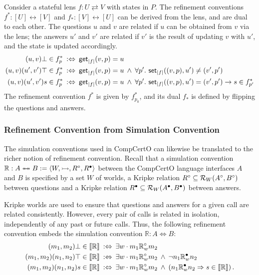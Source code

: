 Consider a stateful lens
$f: U \rightleftarrows V$
with states in $P$.
The refinement conventions
$f^* : [U] \leftrightarrow [V]$
and
$f_* : [V] \leftrightarrow [U]$
can be derived from the lens,
and are dual to each other.
The questions $u$ and $v$
are related if $u$ can be obtained from $v$
via the lens;
the answers $u'$ and $v'$ are related
if $v'$ is the result of updating $v$ with $u'$,
and the state is updated accordingly.
\begin{align*}
  (u, v)\bot \in f^*_p
  & \::\Leftrightarrow\:
   \mathsf{get} _{|f|} (v, p) = u \\
  (u, v)(u', v')\top \in f^*_p
  & \::\Leftrightarrow\:
   \mathsf{get} _{|f|} (v, p) = u \:\wedge\:
  \forall p'.\  \mathsf{set} _{|f|} ((v, p), u') \neq (v', p')\\
  (u, v)(u', v') s \in f^*_p
  & \::\Leftrightarrow\:
   \mathsf{get} _{|f|} (v, p) = u \:\wedge\:
  \forall p'.\  \mathsf{set} _{|f|} ((v, p), u') = (v', p') \rightarrow
  s \in f^*_{p'}
\end{align*}
The refinement convention $f^*$
is given by $f^*_{p_0}$,
and its dual $f_*$ is defined
by flipping the questions and answers.

\subsubsection{Refinement Convention from Simulation Convention}
\label{sec:rc:refconv-simconv}

The simulation conventions used in CompCertO
can likewise be translated to the richer notion of
refinement convention.
Recall that
a simulation convention
$\mathbb{R} : A \twoheadleftarrow \mathrel{\mkern-15mu} \twoheadrightarrow B := \langle W, \rightarrowtail, R^\circ, R^\bullet \rangle$
between the CompCertO language interfaces $A$ and $B$ is specified by
a set $W$ of worlds,
a Kripke relation $R^\circ \subseteq \mathcal{R}_W (A^\circ, B^\circ)$
between questions
and
a Kripke relation $R^\bullet \subseteq \mathcal{R}_W (A^\bullet, B^\bullet)$
between answers.

Kripke worlds are used to ensure that
questions and answers for a given call
are related consistently.
However, every pair of calls
is related in isolation,
independently of any past or future calls.
Thus, the following
refinement convention
embeds the simulation convention $\mathbb{R} : A \Leftrightarrow B$:
\begin{align*}
  (m_1, m_2) \bot \in \llbracket \mathbb{R} \rrbracket \: :\Leftrightarrow \: {}
  &\exists w \cdot m_1 \mathbb{R}^\circ_w m_2
  \\
  (m_1, m_2) (n_1, n_2) \top \in \llbracket \mathbb{R} \rrbracket \::\Leftrightarrow\: {}
  &\exists w \cdot m_1 \mathbb{R}^\circ_w m_2 \:\wedge\:
  \neg n_1 \mathbb{R}^\bullet_w n_2
  \\
  (m_1, m_2) (n_1, n_2) s \in \llbracket \mathbb{R} \rrbracket \::\Leftrightarrow\: {}
  &\exists w \cdot m_1 \mathbb{R}^\circ_w m_2 \:\wedge\:
  (n_1 \mathbb{R}^\bullet_w n_2 \Rightarrow s \in \llbracket \mathbb{R} \rrbracket)
  \,.
\end{align*}


